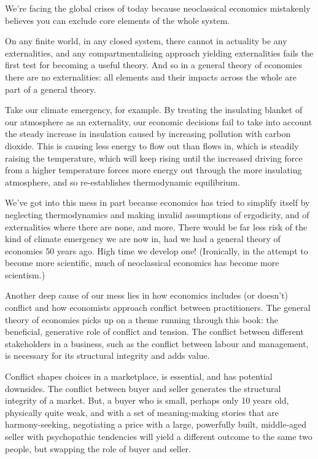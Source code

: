 We’re facing the global crises of today because neoclassical economics mistakenly believes you can exclude core elements of the whole system. 


On any finite world, in any closed system, there cannot in actuality be any externalities, and any compartmentalising approach yielding externalities fails the first test for becoming a useful theory. And so in a general theory of economies there are no externalities: all elements and their impacts across the whole are part of a general theory.


Take our climate emergency,  for example. By treating the insulating blanket of our atmosphere as an externality, our economic decisions fail to take into account the steady increase in insulation caused by increasing pollution with carbon dioxide. This is causing less energy to flow out than flows in, which is steadily raising the temperature, which will keep rising until the increased driving force from a higher temperature forces more energy out through the more insulating atmosphere, and so re-establishes thermodynamic equilibrium. 


We've got into this mess in part because economics  has tried to simplify itself by neglecting thermodynamics and making invalid assumptions of ergodicity, and of externalities where there are none, and more. There would be far less risk of the kind of climate emergency we are now in, had we had a general theory of economies 50 years ago. High time we develop one! (Ironically, in the attempt to become more scientific, much of neoclassical economics  has become more scientism.) 


Another deep cause of our mess lies in how economics includes (or doesn’t) conflict and how economists approach conflict between practitioners. The general theory of economies  picks up on a theme running through this book: the beneficial, generative role of conflict and tension. The conflict  between different stakeholders  in a business, such as the conflict  between labour and management, is necessary for its structural integrity and adds value.


Conflict shapes choices in a marketplace, is essential, and has potential downsides. The conflict between buyer and seller generates the structural integrity of a market. But, a buyer who is small, perhaps only 10 years old, physically quite weak, and with a set of meaning-making stories that are harmony-seeking, negotiating a price with a large, powerfully built, middle-aged seller with psychopathic tendencies will yield a different outcome to the same two people, but swapping the role of buyer and seller.  


